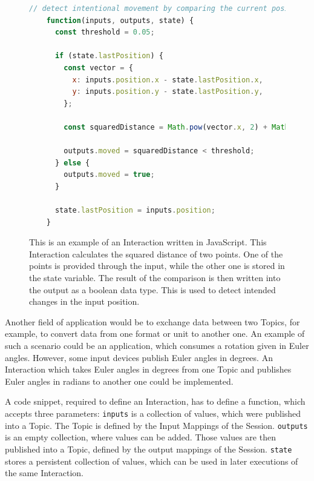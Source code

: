 \begin{figure}[H]
	\begin{lstlisting}[language=JavaScript]
    // detect intentional movement by comparing the current position with a previous one
    function(inputs, outputs, state) {
      const threshold = 0.05;

      if (state.lastPosition) {
        const vector = {
          x: inputs.position.x - state.lastPosition.x,
          y: inputs.position.y - state.lastPosition.y,
        };

        const squaredDistance = Math.pow(vector.x, 2) + Math.pow(vector.y, 2);

        outputs.moved = squaredDistance < threshold;
      } else {
        outputs.moved = true;
      }

      state.lastPosition = inputs.position;
    }
  \end{lstlisting}
	\caption[UBII Interaction in JavaScript]{This is an example of an Interaction written in JavaScript. This Interaction calculates the squared distance of two points. One of the points is provided through the input, while the other one is stored in the state variable. The result of the comparison is then written into the output as a boolean data type. This is used to detect intended changes in the input position.}\label{fig:ubii-interaction-example}
\end{figure}

Another field of application would be to exchange data between two Topics, for example, to convert data from one format or unit to another one. An example of such a scenario could be an application, which consumes a rotation given in Euler angles. %
However, some input devices publish Euler angles in degrees. An Interaction which takes Euler angles in degrees from one Topic and publishes Euler angles in radians to another one could be implemented.

A code snippet, required to define an Interaction, has to define a function, which accepts three parameters:
\lstinline{inputs} is a collection of values, which were published into a Topic. The Topic is defined by the Input Mappings of the Session. \lstinline{outputs} is an empty collection, where values can be added. Those values are then published into a Topic, defined by the output mappings of the Session. \lstinline{state} stores a persistent collection of values, which can be used in later executions of the same Interaction.